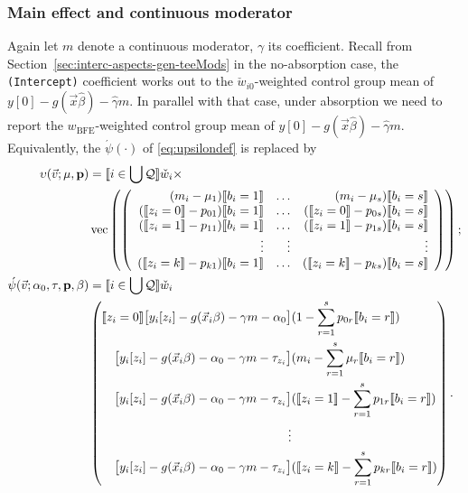\documentclass{article}
\DeclarePairedDelimiter{\indicator}{\llbracket}{\rrbracket}
\newcommand{\owt}[1][{[z_{i}]}]{\ensuremath{\check{w}_{i#1}}}
\newcommand{\absorbInterceptsEF}{\upsilon}
\begin{document}
\subsubsection{Main effect and continuous moderator}
Again let $m$ denote a continuous moderator, $\gamma$ its
coefficient. Recall from Section~\ref{sec:interc-aspects-gen-teeMods} in the no-absorption case, the \texttt{(Intercept)}
coefficient works out to the $\owt[0]$-weighted control group mean of $y[0] - g(\vec{x}\hat\beta) -
\hat{\gamma}m$. In parallel with that case, under absorption we need to report the  $w_{\text{BFE}}$-weighted control group mean of $y[0] - g(\vec{x}\hat\beta) -
\hat{\gamma}m$. Equivalently, the $\acute{\psi}(\cdot)$ of
\eqref{eq:upsilondef} is replaced by
\begin{align}
    \absorbInterceptsEF(\vec{v}; \mu, \mathbf{p}) &=
                                             \indicator{i \in \bigcup \mathcal{Q}} \owt[] \times \nonumber \\
  &\operatorname{vec}\left(%
    \left(
    \begin{array}{rrr}
      (m_{i} - \mu_{1}) \indicator{b_{i}=1} & \ldots & 
(m_{i} - \mu_{s}) \indicator{b_{i}=s} \\
      (\indicator{z_{i}=0}-p_{01})\indicator{b_{i}=1}
      &\ldots
      &
        (\indicator{z_{i}=0}-p_{0s})\indicator{b_{i}=s}
      \\
      (\indicator{z_{i}=1}-p_{11})\indicator{b_{i}=1}
      &\ldots
      &
        (\indicator{z_{i}=1}-p_{1s})\indicator{b_{i}=s}
      \\
      \vdots & \vdots & \vdots \\
      (\indicator{z_{i}=k}-p_{k1})\indicator{b_{i}=1}
      &\ldots
      &
        (\indicator{z_{i}=k}-p_{ks})\indicator{b_{i}=s}\\                                      \end{array}
  \right)%
  \right) ;\nonumber \\
    \acute{\psi}(\vec{v}; \alpha_{0}, \tau, \mathbf{p}, \beta) &=
    \indicator{i \in \bigcup \mathcal{Q}}\owt[] \nonumber
  \\
&\left(
  \begin{aligned}                                               
    \indicator{z_{i}=0} \big[y_{i}[z_{i}]
    -
    g(\vec{x}_{i}\beta) - {\gamma}m-\alpha_{0}\big]
    &(
   1 - \sum_{r=1}^{s}p_{0r}\indicator{b_{i}=r}) \\
\big[y_{i}[z_{i}]
    -
    g(\vec{x}_{i}\beta)-\alpha_{0}- {\gamma}m-\tau_{z_{i}}\big]
    &(m_{i} - \sum_{r=1}^{s}\mu_{r}\indicator{b_{i}=r})
    \\
   \big[y_{i}[z_{i}]
    -
    g(\vec{x}_{i}\beta)-\alpha_{0}- {\gamma}m-\tau_{z_{i}}\big]
    &(
    \indicator{z_{i}=1} - \sum_{r=1}^{s}p_{1r}\indicator{b_{i}=r})\\
    \vdots \\
    {}\big[y_{i}[z_{i}]
    - g(\vec{x}_{i}\beta) - \alpha_{0}- {\gamma}m -
    \tau_{z_{i}}\big]
    &(\indicator{z_{i}=k}
    - \sum_{r=1}^{s}p_{kr}\indicator{b_{i}=r})\\
  \end{aligned}
\right) .\label{eq:30}
\end{align}
\end{document}
